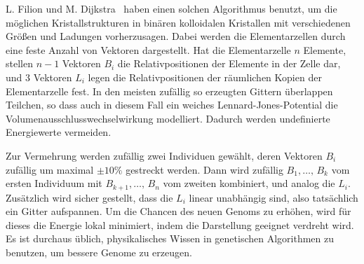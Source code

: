 L. Filion und M. Dijkstra~\cite{filion09a} haben einen solchen
Algorithmus benutzt, um die möglichen Kristallstrukturen in binären
kolloidalen Kristallen mit verschiedenen Größen und Ladungen
vorherzusagen. Dabei werden die Elementarzellen durch eine feste
Anzahl von Vektoren dargestellt. Hat die Elementarzelle $n$ Elemente,
stellen $n-1$ Vektoren $B_i$ die Relativpositionen der Elemente in der
Zelle dar, und 3 Vektoren $L_i$ legen die Relativpositionen der
räumlichen Kopien der Elementarzelle fest. In den meisten zufällig so
erzeugten Gittern überlappen Teilchen, so dass auch in diesem Fall ein
weiches Lennard-Jones-Potential die Volumenausschlusswechselwirkung
modelliert. Dadurch werden undefinierte Energiewerte vermeiden.

Zur Vermehrung werden zufällig zwei Individuen gewählt, deren Vektoren
$B_i$ zufällig um maximal $\pm 10\%$ gestreckt werden. Dann wird
zufällig $B_1,\ldots,\,B_k$ vom ersten Individuum mit
$B_{k+1},\ldots,\,B_n$ vom zweiten kombiniert, und analog die
$L_i$. Zusätzlich wird sicher gestellt, dass die $L_i$ linear
unabhängig sind, also tatsächlich ein Gitter aufspannen. Um die
Chancen des neuen Genoms zu erhöhen, wird für dieses die Energie lokal
minimiert, indem die Darstellung geeignet verdreht wird. Es ist durchaus
üblich, physikalisches Wissen in genetischen Algorithmen zu benutzen,
um bessere Genome zu erzeugen.

